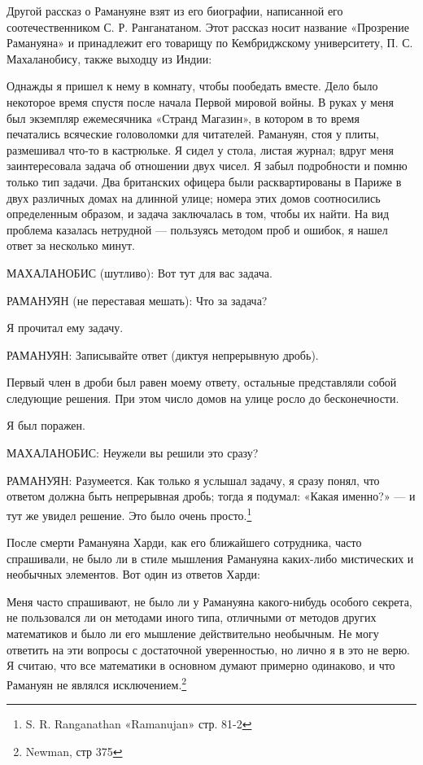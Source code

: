 \documentclass[../main.tex]{subfiles}
\begin{document}
Другой рассказ о Рамануяне взят из его биографии, написанной его соотечественником С. Р. Ранганатаном. Этот рассказ носит название «Прозрение Рамануяна» и принадлежит его товарищу по Кембриджскому университету, П. С. Махаланобису, также выходцу из Индии:

Однажды я пришел к нему в комнату, чтобы пообедать вместе. Дело было некоторое время спустя после начала Первой мировой войны. В руках у меня был экземпляр ежемесячника «Странд Магазин», в котором в то время печатались всяческие головоломки для читателей. Рамануян, стоя у плиты, размешивал что-то в кастрюльке. Я сидел у стола, листая журнал; вдруг меня заинтересовала задача об отношении двух чисел. Я забыл подробности и помню только тип задачи. Два британских офицера были расквартированы в Париже в двух различных домах на длинной улице; номера этих домов соотносились определенным образом, и задача заключалась в том, чтобы их найти. На вид проблема казалась нетрудной --- пользуясь методом проб и ошибок, я нашел ответ за несколько минут.

МАХАЛАНОБИС (шутливо): Вот тут для вас задача.

РАМАНУЯН (не переставая мешать): Что за задача?

Я прочитал ему задачу.

РАМАНУЯН: Записывайте ответ (диктуя непрерывную дробь).

Первый член в дроби был равен моему ответу, остальные представляли собой следующие решения. При этом число домов на улице росло до бесконечности.

Я был поражен.

МАХАЛАНОБИС: Неужели вы решили это сразу?

РАМАНУЯН: Разумеется. Как только я услышал задачу, я сразу понял, что ответом должна быть непрерывная дробь; тогда я подумал: «Какая именно?» --- и тут же увидел решение. Это было очень просто.\footnote{S. R. Ranganathan «Ramanujan» стр. 81-2}

После смерти Рамануяна Харди, как его ближайшего сотрудника, часто спрашивали, не было ли в стиле мышления Рамануяна каких-либо мистических и необычных элементов. Вот один из ответов Харди:

Меня часто спрашивают, не было ли у Рамануяна какого-нибудь особого секрета, не пользовался ли он методами иного типа, отличными от методов других математиков и было ли его мышление действительно необычным. Не могу ответить на эти вопросы с достаточной уверенностью, но лично я в это не верю. Я считаю, что все математики в основном думают примерно одинаково, и что Рамануян не являлся исключением.\footnote{Newman, стр 375}
\end{document}
